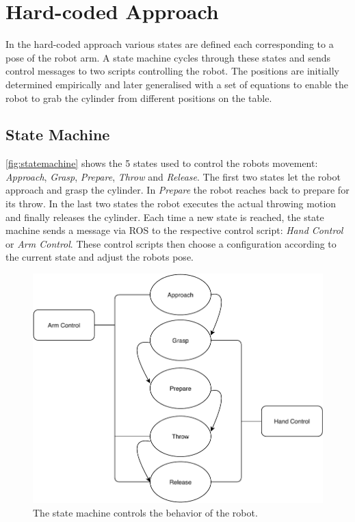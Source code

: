 \section{Hard-coded Approach}
\label{sec:hard-coded}
In the hard-coded approach various states are defined each corresponding to a pose of the robot arm.
A state machine cycles through these states and sends control messages to two scripts controlling the robot.
The positions are initially determined empirically and later generalised with a set of equations to enable the robot to grab the cylinder from different positions on the table.

\subsection{State Machine}
\autoref{fig:statemachine} shows the 5 states used to control the robots movement: \textit{Approach}, \textit{Grasp}, \textit{Prepare}, \textit{Throw} and \textit{Release}.
The first two states let the robot approach and grasp the cylinder.
In \textit{Prepare} the robot reaches back to prepare for its throw.
In the last two states the robot executes the actual throwing motion and finally releases the cylinder.
Each time a new state is reached, the state machine sends a message via ROS to the respective control script: \textit{Hand Control} or \textit{Arm Control}.
These control scripts then choose a configuration according to the current state and adjust the robots pose.

\begin{figure}[tpb]
\centering
	\includegraphics[width=0.96\linewidth]{figures/state.pdf} 
	\caption{The state machine controls the behavior of the robot.}
	\vspace{-0.4cm}
	\label{fig:statemachine}
\end{figure}

